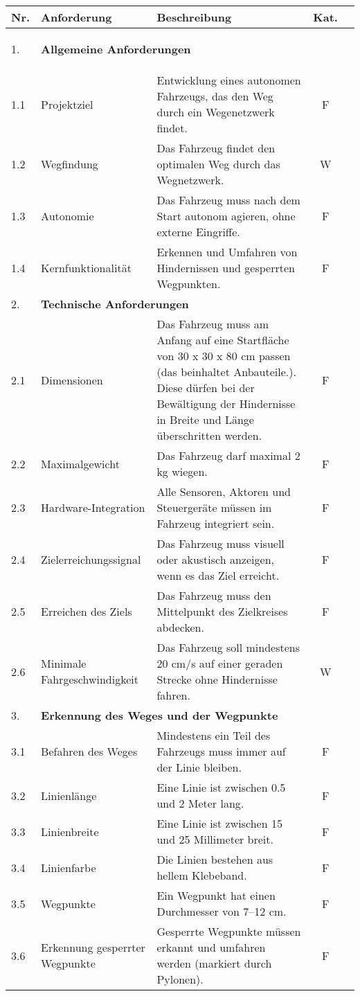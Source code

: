 \documentclass[../main.tex]{subfiles}
\begin{document}
\begin{longtable}[]{@{}lp{4.5cm}p{7.5cm}cc}
  \textbf{Nr.}
& \textbf{Anforderung}
& \textbf{Beschreibung}
& \textbf{Kat.}

\tabularnewline
\hline
\endhead
  \hypertarget{A1}{1.} & \multicolumn{4}{l}{\textbf{Allgemeine Anforderungen}} \\ \hline
  1.1 & Projektziel & Entwicklung eines autonomen Fahrzeugs, das den Weg durch ein Wegenetzwerk findet. & F\\ \hline
  1.2 & Wegfindung & Das Fahrzeug findet den optimalen Weg durch das Wegnetzwerk. & W \\ \hline
  1.3 & Autonomie & Das Fahrzeug muss nach dem Start autonom agieren, ohne externe Eingriffe. & F  \\ \hline
  1.4 & Kernfunktionalität & Erkennen und Umfahren von Hindernissen und gesperrten Wegpunkten. & F  \\ \hline
  
  2.  & \multicolumn{4}{l}{\textbf{Technische Anforderungen}} \\ \hline
  \hypertarget{A2.1}{2.1} & Dimensionen & Das Fahrzeug muss am Anfang auf eine Startfläche von 30 x 30 x 80 cm passen (das beinhaltet Anbauteile.). Diese dürfen bei der Bewältigung der Hindernisse in Breite und Länge überschritten werden. & F \\ \hline
  2.2 & Maximalgewicht & Das Fahrzeug darf maximal 2 kg wiegen. & F  \\ \hline
  \hypertarget{A2.3}{2.3} & Hardware-Integration & Alle Sensoren, Aktoren und Steuergeräte müssen im Fahrzeug integriert sein. & F\\ \hline
  \hypertarget{A2.4}{2.4} & Zielerreichungssignal & Das Fahrzeug muss visuell oder akustisch anzeigen, wenn es das Ziel erreicht. & F \\ \hline
  \hypertarget{A2.5}{2.5} & Erreichen des Ziels & Das Fahrzeug muss den Mittelpunkt des Zielkreises abdecken. & F \\ \hline
  \hypertarget{A2.6}{2.6} & Minimale Fahrgeschwindigkeit & Das Fahrzeug soll mindestens 20 cm/s auf einer geraden Strecke ohne Hindernisse fahren. & W \\ \hline
 
  3.  & \multicolumn{4}{l}{\textbf{Erkennung des Weges und der Wegpunkte}} \\ \hline
  \hypertarget{A3.1}{3.1} & Befahren des Weges & Mindestens ein Teil des Fahrzeugs muss immer auf der Linie bleiben. & F \\ \hline
  3.2 & Linienlänge & Eine Linie ist zwischen 0.5 und 2 Meter lang. & F \\ \hline
  3.3 & Linienbreite & Eine Linie ist zwischen 15 und 25 Millimeter breit. & F \\ \hline
  3.4 & Linienfarbe & Die Linien bestehen aus hellem Klebeband. & F \\ \hline
  3.5 & Wegpunkte & Ein Wegpunkt hat einen Durchmesser von 7–12 cm. & F \\ \hline
  \hypertarget{A3.6}{3.6} & Erkennung gesperrter Wegpunkte & Gesperrte Wegpunkte müssen erkannt und umfahren werden (markiert durch Pylonen). & F \\ \hline


\end{longtable}
\end{document}
